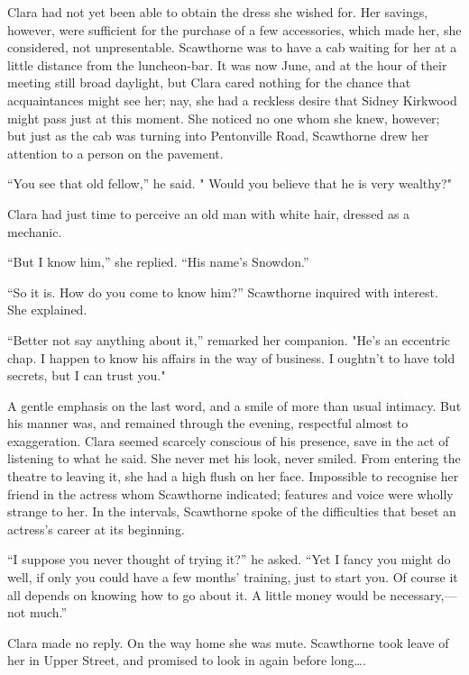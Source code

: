 Clara had not yet been able to obtain the dress she wished for. Her
savings, however, were sufficient for the purchase of a few accessories,
which made her, she considered, not
{\protect\hypertarget{211}{}{}}unpresentable. Scawthorne was to have a
cab waiting for her at a little distance from the luncheon-bar. It was
now June, and at the hour of their meeting still broad daylight, but
Clara cared nothing for the chance that acquaintances might see her;
nay, she had a reckless desire that Sidney Kirkwood might pass just at
this moment. She noticed no one whom she knew, however; but just as the
cab was turning into Pentonville Road, Scawthorne drew her attention to
a person on the pavement.

``You see that old fellow,'' he said. " Would you believe that he is
very wealthy?"

Clara had just time to perceive an old man with white hair, dressed as a
mechanic.

``But I know him,'' she replied. ``His name's Snowdon.''

``So it is. How do you come to know him?'' Scawthorne inquired with
interest. She explained.

``Better not say anything about it,'' remarked her companion. "He's an
eccentric chap. I happen to know his affairs in the
{\protect\hypertarget{212}{}{}}way of business. I oughtn't to have told
secrets, but I can trust you."

A gentle emphasis on the last word, and a smile of more than usual
intimacy. But his manner was, and remained through the evening,
respectful almost to exaggeration. Clara seemed scarcely conscious of
his presence, save in the act of listening to what he said. She never
met his look, never smiled. From entering the theatre to leaving it, she
had a high flush on her face. Impossible to recognise her friend in the
actress whom Scawthorne indicated; features and voice were wholly
strange to her. In the intervals, Scawthorne spoke of the difficulties
that beset an actress's career at its beginning.

``I suppose you never thought of trying it?'' he asked. ``Yet I fancy
you might do well, if only you could have a few months' training, just
to start you. Of course it all depends on knowing how to go about it. A
little money would be necessary,---not much.''

{\protect\hypertarget{213}{}{}}Clara made no reply. On the way home she
was mute. Scawthorne took leave of her in Upper Street, and promised to
look in again before long\ldots{}.

